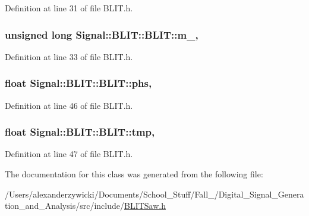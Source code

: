 Definition at line 31 of file B\+L\+I\+T.\+h.

\hypertarget{classSignal_1_1BLIT_1_1BLIT_a314aae37a0a53fa3f79a4466b9558fa5}{
\subsubsection[{m\+\_\+}]{\setlength{\rightskip}{0pt plus 5cm}unsigned long Signal\+::\+B\+L\+I\+T\+::\+B\+L\+I\+T\+::m\+\_\+\hspace{0.3cm}{\ttfamily [protected]}, {\ttfamily [inherited]}}}\label{classSignal_1_1BLIT_1_1BLIT_a314aae37a0a53fa3f79a4466b9558fa5}


Definition at line 33 of file B\+L\+I\+T.\+h.

\hypertarget{classSignal_1_1BLIT_1_1BLIT_afd06bf26696642f7eb400fb984e524f3}{
\subsubsection[{phs}]{\setlength{\rightskip}{0pt plus 5cm}float Signal\+::\+B\+L\+I\+T\+::\+B\+L\+I\+T\+::phs\hspace{0.3cm}{\ttfamily [protected]}, {\ttfamily [inherited]}}}\label{classSignal_1_1BLIT_1_1BLIT_afd06bf26696642f7eb400fb984e524f3}


Definition at line 46 of file B\+L\+I\+T.\+h.

\hypertarget{classSignal_1_1BLIT_1_1BLIT_aa543d207e6dd260762652221c598bae9}{
\subsubsection[{tmp}]{\setlength{\rightskip}{0pt plus 5cm}float Signal\+::\+B\+L\+I\+T\+::\+B\+L\+I\+T\+::tmp\hspace{0.3cm}{\ttfamily [protected]}, {\ttfamily [inherited]}}}\label{classSignal_1_1BLIT_1_1BLIT_aa543d207e6dd260762652221c598bae9}


Definition at line 47 of file B\+L\+I\+T.\+h.



The documentation for this class was generated from the following file\+:\begin{DoxyCompactItemize}
\item 
/\+Users/alexanderzywicki/\+Documents/\+School\+\_\+\+Stuff/\+Fall\+\_/\+Digital\+\_\+\+Signal\+\_\+\+Generation\+\_\+and\+\_\+\+Analysis/src/include/\hyperlink{BLITSaw_8h}{B\+L\+I\+T\+Saw.\+h}\end{DoxyCompactItemize}
